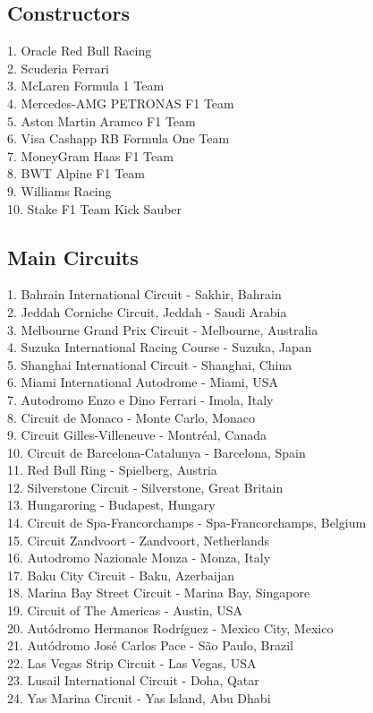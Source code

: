 \documentclass[12pt]{article}
\begin{document}
\subsection{Constructors}
1. Oracle Red Bull Racing\\
2. Scuderia Ferrari\\
3. McLaren Formula 1 Team\\
4. Mercedes-AMG PETRONAS F1 Team\\
5. Aston Martin Aramco F1 Team\\
6. Visa Cashapp RB Formula One Team\\
7. MoneyGram Haas F1 Team\\
8. BWT Alpine F1 Team\\
9. Williams Racing\\
10. Stake F1 Team Kick Sauber
\subsection{Main Circuits}
1. Bahrain International Circuit - Sakhir, Bahrain\\
2. Jeddah Corniche Circuit, Jeddah - Saudi Arabia\\
3. Melbourne Grand Prix Circuit - Melbourne, Australia\\
4. Suzuka International Racing Course - Suzuka, Japan\\
5. Shanghai International Circuit - Shanghai, China\\
6. Miami International Autodrome - Miami, USA\\
7. Autodromo Enzo e Dino Ferrari - Imola, Italy\\
8. Circuit de Monaco - Monte Carlo, Monaco\\
9. Circuit Gilles-Villeneuve - Montréal, Canada\\
10. Circuit de Barcelona-Catalunya - Barcelona, Spain\\
11. Red Bull Ring - Spielberg, Austria\\
12. Silverstone Circuit - Silverstone, Great Britain\\
13. Hungaroring - Budapest, Hungary\\
14. Circuit de Spa-Francorchamps - Spa-Francorchamps, Belgium\\
15. Circuit Zandvoort - Zandvoort, Netherlands\\
16. Autodromo Nazionale Monza - Monza, Italy\\
17. Baku City Circuit - Baku, Azerbaijan\\
18. Marina Bay Street Circuit - Marina Bay, Singapore\\
19. Circuit of The Americas - Austin, USA\\
20. Autódromo Hermanos Rodríguez - Mexico City, Mexico\\
21. Autódromo José Carlos Pace - São Paulo, Brazil\\
22. Las Vegas Strip Circuit - Las Vegas, USA\\
23. Lusail International Circuit - Doha, Qatar\\
24. Yas Marina Circuit - Yas Island, Abu Dhabi
\end{document}
